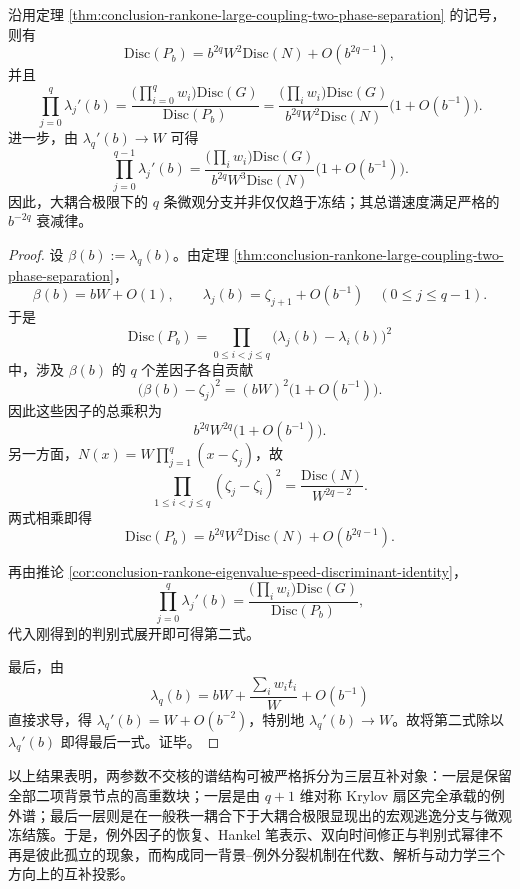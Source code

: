 \begin{theorem}[大耦合判别式与微观谱速度的幂律]\label{thm:conclusion-rankone-large-coupling-discriminant-speed-powerlaw}
沿用定理 \ref{thm:conclusion-rankone-large-coupling-two-phase-separation} 的记号，则有
\[
\mathrm{Disc}(P_b)=b^{2q}W^{2}\mathrm{Disc}(N)+O(b^{2q-1}),
\]
并且
\[
\prod_{j=0}^{q}\lambda_j'(b)
=
\frac{\bigl(\prod_{i=0}^{q}w_i\bigr)\mathrm{Disc}(G)}{\mathrm{Disc}(P_b)}
=
\frac{\bigl(\prod_i w_i\bigr)\mathrm{Disc}(G)}
{b^{2q}W^{2}\mathrm{Disc}(N)}
\bigl(1+O(b^{-1})\bigr).
\]
进一步，由 \(\lambda_q'(b)\to W\) 可得
\[
\prod_{j=0}^{q-1}\lambda_j'(b)
=
\frac{\bigl(\prod_i w_i\bigr)\mathrm{Disc}(G)}
{b^{2q}W^{3}\mathrm{Disc}(N)}
\bigl(1+O(b^{-1})\bigr).
\]
因此，大耦合极限下的 \(q\) 条微观分支并非仅仅趋于冻结；其总谱速度满足严格的 \(b^{-2q}\) 衰减律。
\end{theorem}
\begin{proof}
设 \(\beta(b):=\lambda_q(b)\)。由定理 \ref{thm:conclusion-rankone-large-coupling-two-phase-separation}，
\[
\beta(b)=bW+O(1),
\qquad
\lambda_j(b)=\zeta_{j+1}+O(b^{-1})
\quad (0\le j\le q-1).
\]
于是
\[
\mathrm{Disc}(P_b)
=
\prod_{0\le i<j\le q}\bigl(\lambda_j(b)-\lambda_i(b)\bigr)^2
\]
中，涉及 \(\beta(b)\) 的 \(q\) 个差因子各自贡献
\[
\bigl(\beta(b)-\zeta_j\bigr)^2=(bW)^2\bigl(1+O(b^{-1})\bigr).
\]
因此这些因子的总乘积为
\[
b^{2q}W^{2q}\bigl(1+O(b^{-1})\bigr).
\]
另一方面，\(N(x)=W\prod_{j=1}^{q}(x-\zeta_j)\)，故
\[
\prod_{1\le i<j\le q}(\zeta_j-\zeta_i)^2
=
\frac{\mathrm{Disc}(N)}{W^{2q-2}}.
\]
两式相乘即得
\[
\mathrm{Disc}(P_b)=b^{2q}W^{2}\mathrm{Disc}(N)+O(b^{2q-1}).
\]

再由推论 \ref{cor:conclusion-rankone-eigenvalue-speed-discriminant-identity}，
\[
\prod_{j=0}^{q}\lambda_j'(b)
=
\frac{\bigl(\prod_i w_i\bigr)\mathrm{Disc}(G)}{\mathrm{Disc}(P_b)},
\]
代入刚得到的判别式展开即可得第二式。

最后，由
\[
\lambda_q(b)=bW+\frac{\sum_i w_i t_i}{W}+O(b^{-1})
\]
直接求导，得 \(\lambda_q'(b)=W+O(b^{-2})\)，特别地 \(\lambda_q'(b)\to W\)。故将第二式除以 \(\lambda_q'(b)\) 即得最后一式。证毕。
\end{proof}

以上结果表明，两参数不交核的谱结构可被严格拆分为三层互补对象：一层是保留全部二项背景节点的高重数块；一层是由 \(q+1\) 维对称 Krylov 扇区完全承载的例外谱；最后一层则是在一般秩一耦合下于大耦合极限显现出的宏观逃逸分支与微观冻结簇。于是，例外因子的恢复、Hankel 笔表示、双向时间修正与判别式幂律不再是彼此孤立的现象，而构成同一背景--例外分裂机制在代数、解析与动力学三个方向上的互补投影。

\endinput
